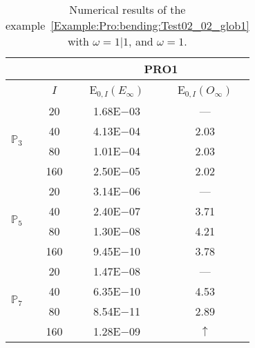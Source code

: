 \begin{table}[H]
\caption{Numerical results of the example~\ref{Example:Pro:bending:Test02_02_glob1} with $\omega=1|1$, and $\omega=1$.}
\setlength{\tabcolsep}{5pt}
\centering
\begin{tabular}{@{}l c c c@{}}
\toprule
 &  & \multicolumn{2}{c}{PRO1}\\
\midrule
 & $I$ & E$_{0,I}(E_{\infty})$ & E$_{0,I}(O_{\infty})$\\
\midrule
\multirow{4}{*}{$\mathbb{P}_{3}$} & 20 & 1.68E$-$03 & ---\\
 & 40 & 4.13E$-$04 & 2.03\\
 & 80 & 1.01E$-$04 & 2.03\\
 & 160 & 2.50E$-$05 & 2.02\\
\midrule
\multirow{4}{*}{$\mathbb{P}_{5}$} & 20 & 3.14E$-$06 & ---\\
 & 40 & 2.40E$-$07 & 3.71\\
 & 80 & 1.30E$-$08 & 4.21\\
 & 160 & 9.45E$-$10 & 3.78\\
\midrule
\multirow{4}{*}{$\mathbb{P}_{7}$} & 20 & 1.47E$-$08 & ---\\
 & 40 & 6.35E$-$10 & 4.53\\
 & 80 & 8.54E$-$11 & 2.89\\
 & 160 & 1.28E$-$09 & $\uparrow$\\
\bottomrule
\end{tabular}
\label{Table:PRO:test_02_02_test21}
\end{table}
